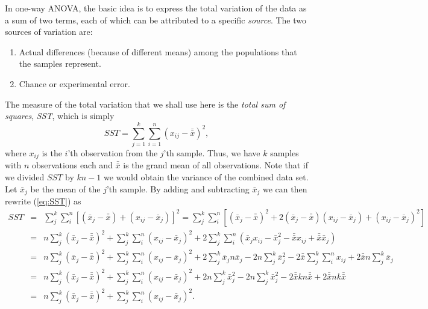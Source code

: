 	In one-way ANOVA, the basic idea is to express the total variation of the data as a 
sum of two terms, each of which can be attributed to a specific \emph{source}.  The two sources of variation are:
\begin{enumerate}
\item Actual differences (because of different means) among the populations that the samples represent.
\item Chance or experimental error.
\end{enumerate}
The measure of the total variation that we shall use here is the \emph{total sum of squares}, \emph{SST}, which is simply
\begin{equation}
SST = \sum ^k _{j=1} \sum ^n _{i=1} (x_{ij} - \bar{\bar{x}} ) ^2,
\label{eq:SST}
\end{equation}	 	
where $x_{ij}$ is the $i$'th observation from the $j$'th sample.  Thus, we have $k$ samples with $n$ observations 
each and $\bar{\bar{x}}$  is the grand mean of all observations.  Note that if we divided $SST$ by 
$kn-1$ we would obtain the variance 
of the combined data set.  Let $\bar{x}_j$  be the mean of the $j$'th sample.  By adding and subtracting
$\bar{x}_j$ we can then rewrite (\ref{eq:SST}) as
\begin{equation}
\begin{array}{rcl}
SST & = & \displaystyle \sum^k_j \sum^n_i [ ( \bar{x}_j - \bar{\bar{x}})   + (x_{ij} - \bar{x}_j)]^2 =  \sum^k_j \sum^n_i [(\bar{x}_{j} - \bar{\bar{x}})^2  + 2 (\bar{x}_j - \bar{\bar{x}}) (x_{ij} - \bar{x}_j) +  (x_{ij} - \bar{x}_j)^2]   \\
 & = & \displaystyle n \sum^k_j   ( \bar{x}_j - \bar{\bar{x}})^2  +  \sum^k_j \sum^n_i  (x_{ij} - \bar{x}_j)^2  +   2 \sum^k_j \sum^n_i (\bar{x}_j x_{ij} - \bar{x}^2_j - \bar{\bar{x}}x_{ij} + \bar{\bar{x}}  \bar{x}_j)   \\
 & = &   \displaystyle n \sum^k_j  ( \bar{x}_j - \bar{\bar{x}})^2 + \sum^k_j \sum^n_i  (x_{ij} - \bar{x}_j)^2 +     2  \sum^k_j  \bar{x}_j n \bar{x}_j - 2n        \sum^k_j   \bar{x}^2_j - 2\bar{\bar{x}}    \sum^k_j \sum^n_i  x_{ij} + 2 \bar{\bar{x}} n  \sum^k_j \bar{x}_j\\
& = & n \displaystyle  \sum^k_j  ( \bar{x}_j - \bar{\bar{x}})^2    + \sum^k_j \sum^n_i (x_{ij} - \bar{x}_j)^2 + 2n      \sum^k_j  \bar{x}^2_j - 2n \sum^k_j \bar{x}^2_j - 2 \bar{\bar{x}}kn \bar{\bar{x}} + 2 \bar{\bar{x}} nk \bar{\bar{x}} \\
& = &  n \displaystyle  \sum^k_j  ( \bar{x}_j - \bar{\bar{x}})^2    + \sum^k_j \sum^n_i
(x_{ij} - \bar{x}_j)^2.
\end{array}
\end{equation}	 
